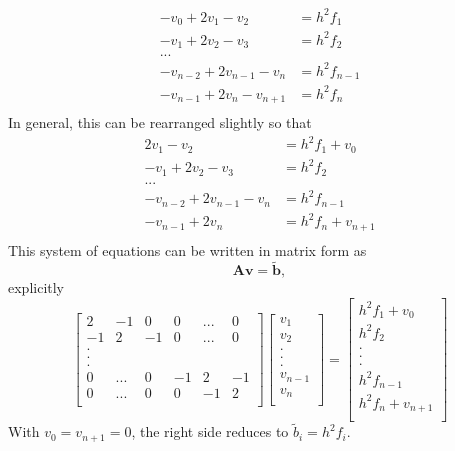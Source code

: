 \documentclass[reprint, english,notitlepage]{revtex4-1}  %
\begin{document}
\begin{align*}
  - v_0 + 2 v_1 - v_2 &= h^2 f_1 \\
  - v_1 + 2 v_2 - v_3 &= h^2 f_2 \\
  ... \\
  - v_{n-2} + 2 v_{n-1} - v_n &= h^2 f_{n-1} \\
  - v_{n-1} + 2 v_n - v_{n+1} &= h^2 f_n \\
\end{align*}
In general, this can be rearranged slightly so that
\begin{align*}
  2 v_1 - v_2 &= h^2 f_1 + v_0 \\
  - v_1 + 2 v_2 - v_3 &= h^2 f_2 \\
  ... \\
  - v_{n-2} + 2 v_{n-1} - v_n &= h^2 f_{n-1} \\
  - v_{n-1} + 2 v_n &= h^2 f_n + v_{n+1} \\
\end{align*}
This system of equations can be written in matrix form as
\begin{equation}
  \label{eq:Poisson_1D_matrix}
  \boldsymbol A \boldsymbol v = \boldsymbol{\tilde{b}},
\end{equation}
explicitly
\begin{equation*}{}
  \begin{bmatrix}
2  & -1 & 0  & 0 & ... & 0 \\
-1 & 2  & -1 & 0 & ... & 0 \\
.  &    &    &   &     & \\
.  &    &    &   &     & \\
.  &    &    &   &     & \\
0  & ...& 0  &-1 & 2   & -1  \\
0  & ...& 0  & 0 &-1 & 2  \\
\end{bmatrix}
  \begin{bmatrix}
 v_1  \\
 v_2  \\
.   \\
.   \\
.   \\
 v_{n-1} \\
v_n \\
\end{bmatrix}
=
\begin{bmatrix}
h^2 f_1 + v_0 \\
h^2 f_2  \\
.   \\
.   \\
.   \\
h^2 f_{n-1} \\
h^2 f_n + v_{n+1}\\
\end{bmatrix}
\end{equation*}
With $v_0 = v_{n+1} = 0$, the right side reduces to $\tilde b_i = h^2 f_i$.
\end{document}
